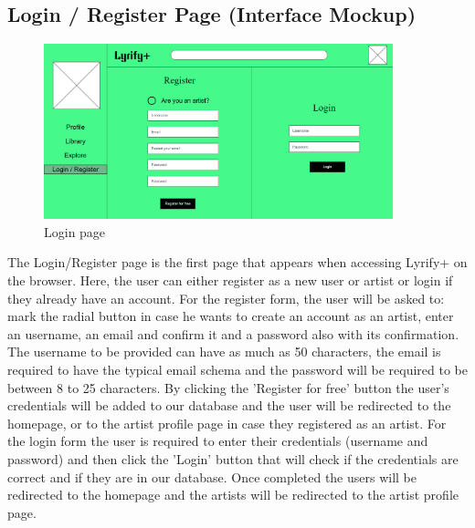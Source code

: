 \subsection{Login / Register Page (Interface Mockup)}

\begin{figure}[h!]
\centering
\includegraphics[width=0.9\textwidth]{sections/PLL/LoginPageMockup.png}
\caption{Login page}
\end{figure}

The Login/Register page is the first page that appears when accessing Lyrify+ on the browser. Here, the user can either register as a new user or artist or login if they already have an account. 
For the register form, the user will be asked to: mark the radial button in case he wants to create an account as an artist, enter an username, an email and confirm it and a password also with its confirmation. The username to be provided can have as much as 50 characters, the email is required to have the typical email schema and the password will be required to be between 8 to 25 characters. By clicking the 'Register for free' button the user's credentials will be added to our database and the user will be redirected to the homepage, or to the artist profile page in case they registered as an artist.  
For the login form the user is required to enter their credentials (username and password) and then click the 'Login' button that will check if the credentials are correct and if they are in our database. Once completed the users will be redirected to the homepage and the artists will be redirected to the artist profile page.